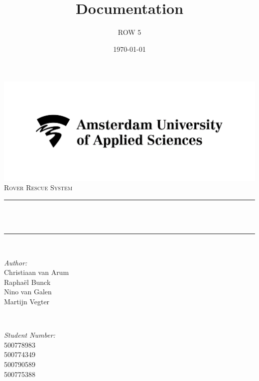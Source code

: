 \documentclass[12pt]{article}
\title{Documentation}
\author{ROW 5}
\date{\today}
\makeatletter
\let\thetitle\@title
\let\thedate\@date
\makeatother
\begin{document}

\begin{titlepage}
	\centering
    \vspace*{0.5 cm}
    \includegraphics[scale=1]{HvA.jpg}\\[1.0 cm]
	\textsc{\Large Rover Rescue System}\\[0.5 cm]
	\rule{\linewidth}{0.2 mm} \\[0.4 cm]
	{ \huge \bfseries \thetitle}\\
	\rule{\linewidth}{0.2 mm} \\[1.5 cm]
	
	\begin{minipage}{0.4\textwidth}
		\begin{flushleft} \large
			\emph{Author:}\\
			Christiaan van Arum\\
			Rapha\"el Bunck\\
			Nino van Galen\\
			Martijn Vegter
			\end{flushleft}
			\end{minipage}~
			\begin{minipage}{0.4\textwidth}
			\begin{flushright} \large
			\emph{Student Number:} \\
			500778983\\ %
			500774349\\ %
			500790589\\ %
			500775388	%
		\end{flushright}
	\end{minipage}\\[2 cm]
	
	{\large \thedate}\\[2 cm]
 
	\vfill
	
\end{titlepage}
\end{document}
